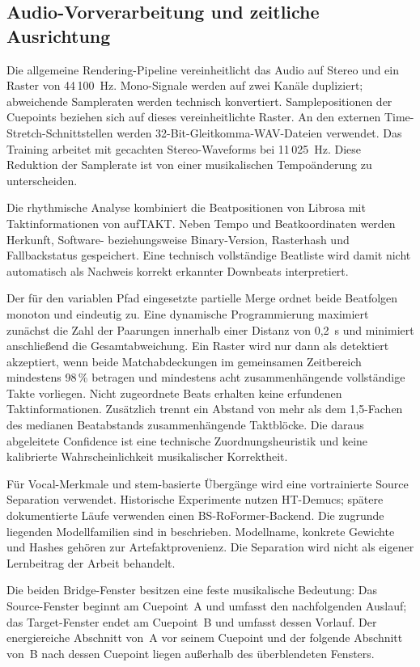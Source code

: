 \subsection{Audio-Vorverarbeitung und zeitliche Ausrichtung}
\label{sec:methodik-vorverarbeitung}

Die allgemeine Rendering-Pipeline vereinheitlicht das Audio auf Stereo und ein Raster von 44\,100~Hz. Mono-Signale werden auf zwei Kanäle dupliziert; abweichende Sampleraten werden technisch konvertiert. Samplepositionen der Cuepoints beziehen sich auf dieses vereinheitlichte Raster. An den externen Time-Stretch-Schnittstellen werden 32-Bit-Gleitkomma-WAV-Dateien verwendet. Das Training arbeitet mit gecachten Stereo-Waveforms bei 11\,025~Hz. Diese Reduktion der Samplerate ist von einer musikalischen Tempoänderung zu unterscheiden.

Die rhythmische Analyse kombiniert die Beatpositionen von Librosa mit Taktinformationen von aufTAKT. Neben Tempo und Beatkoordinaten werden Herkunft, Software- beziehungsweise Binary-Version, Rasterhash und Fallbackstatus gespeichert. Eine technisch vollständige Beatliste wird damit nicht automatisch als Nachweis korrekt erkannter Downbeats interpretiert.

Der für den variablen Pfad eingesetzte partielle Merge ordnet beide Beatfolgen monoton und eindeutig zu. Eine dynamische Programmierung maximiert zunächst die Zahl der Paarungen innerhalb einer Distanz von 0,2~s und minimiert anschließend die Gesamtabweichung. Ein Raster wird nur dann als detektiert akzeptiert, wenn beide Matchabdeckungen im gemeinsamen Zeitbereich mindestens 98\,\% betragen und mindestens acht zusammenhängende vollständige Takte vorliegen. Nicht zugeordnete Beats erhalten keine erfundenen Taktinformationen. Zusätzlich trennt ein Abstand von mehr als dem 1,5-Fachen des medianen Beatabstands zusammenhängende Taktblöcke. Die daraus abgeleitete Confidence ist eine technische Zuordnungsheuristik und keine kalibrierte Wahrscheinlichkeit musikalischer Korrektheit.

Für Vocal-Merkmale und stem-basierte Übergänge wird eine vortrainierte Source Separation verwendet. Historische Experimente nutzen HT-Demucs; spätere dokumentierte Läufe verwenden einen BS-RoFormer-Backend. Die zugrunde liegenden Modellfamilien sind in \cite{rouard2023hybrid,lu2024bsroformer} beschrieben. Modellname, konkrete Gewichte und Hashes gehören zur Artefaktprovenienz. Die Separation wird nicht als eigener Lernbeitrag der Arbeit behandelt.

Die beiden Bridge-Fenster besitzen eine feste musikalische Bedeutung: Das Source-Fenster beginnt am Cuepoint~A und umfasst den nachfolgenden Auslauf; das Target-Fenster endet am Cuepoint~B und umfasst dessen Vorlauf. Der energiereiche Abschnitt von~A vor seinem Cuepoint und der folgende Abschnitt von~B nach dessen Cuepoint liegen außerhalb des überblendeten Fensters.

